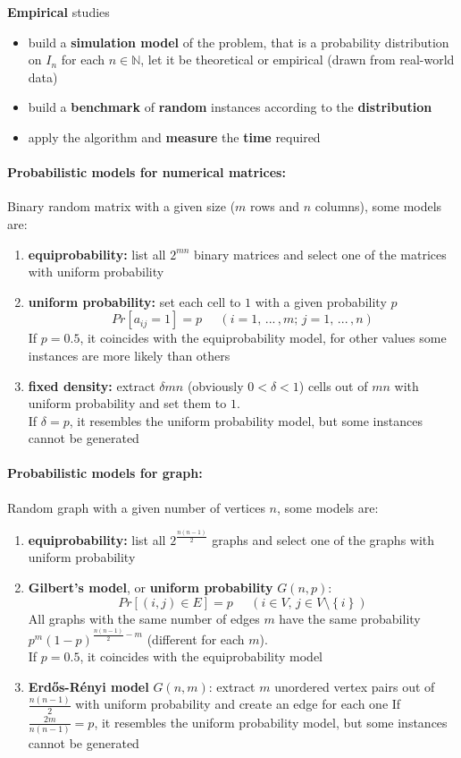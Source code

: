 \textbf{Empirical} studies
\begin{itemize}
	\item build a \textbf{simulation model} of the problem, that is a probability distribution on $I_n$ for each $n \in \mathbb{N}$, let it be theoretical or empirical (drawn from real-world data) 
	\item build a \textbf{benchmark} of \textbf{random} instances according to the \textbf{distribution}
	\item apply the algorithm and \textbf{measure} the \textbf{time} required
\end{itemize}

\paragraph{Probabilistic models for numerical matrices:} Binary random matrix with a given size ($m$ rows and $n$ columns), some models are: 
\begin{enumerate}
	\item \textbf{equiprobability:} list all $2^{mn}$ binary matrices and select one of the matrices with uniform probability
	\item \textbf{uniform probability:} set each cell to $1$ with a given probability $p$
	$$ Pr[a_{ij} = 1] = p \;\;\;\;\; (i = 1, \, ... \, , m; \, j = 1, \, ... \, , n) $$
	If $p = 0.5$, it coincides with the equiprobability model, for other values some instances are more likely than others
	\item \textbf{fixed density:} extract $\delta mn$ (obviously $0 < \delta < 1$) cells out of $mn$ with uniform probability and set them to $1$.\\
	If $\delta = p$, it resembles the uniform probability model, but some instances cannot be generated
\end{enumerate}

\newpage

\paragraph{Probabilistic models for graph:} Random graph with a given number of vertices $n$, some models are: 
\begin{enumerate}
	\item \textbf{equiprobability:} list all $2^{\frac{n(n-1)}{2}}$ graphs and select one of the graphs with uniform probability
	\item \textbf{Gilbert’s model}, or \textbf{uniform probability} $G (n, p)$:
	$$ Pr  \left[(i,j) \in E \right] = p \;\;\;\;\; \left(i \in V , \, j \in V \setminus \left\{i\right\}\right)$$
	All graphs with the same number of edges $m$ have the same probability $p^m (1 − p)^{\frac{n(n-1)}{2} - m}$ (different for each $m$).\\
	If $p = 0.5$, it coincides with the equiprobability model
	\item \textbf{Erd\H{o}s-R\'enyi model} $G (n, m)$: extract $m$ unordered vertex pairs out of $\frac{n(n-1)}{2}$ with uniform probability and create an edge for each one
	If $\frac{2m}{n(n-1)} = p$, it resembles the uniform probability model, but some instances cannot be generated
\end{enumerate}

